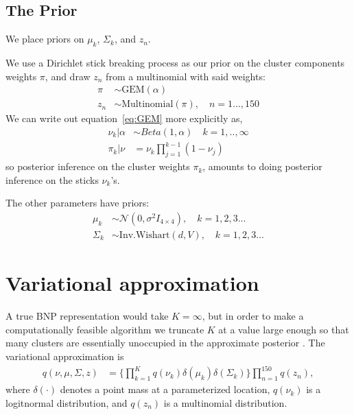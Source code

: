 \documentclass{article}
\begin{document}
\subsection{The Prior}
We place priors on $\mu_k$, $\Sigma_k$, and $z_n$.

We use a Dirichlet stick breaking process \citep{ferguson:1973:bayesian,
sethuraman:1994:constructivedp} as our prior on the cluster components weights
$\pi$, and draw $z_n$ from a multinomial with said weights:
%
\begin{align}
	\pi &\sim \text{GEM}(\alpha) \label{eq:GEM} \\
	 z_n &\sim \text{Multinomial}(\pi), \quad n = 1..., 150
\end{align}
%
We can write out equation~\ref{eq:GEM} more explicitly as,
%
\begin{align}
  \nu_k | \alpha &\sim Beta(1, \alpha) \quad k = 1, .., \infty \label{eq:beta_sticks}\\
  \pi_k | \nu &= \nu_k \prod_{j=1}^{k-1} (1 - \nu_j) \label{eq:stick_breaking}
\end{align}
%
so posterior inference on the cluster weights $\pi_k$, amounts to doing
posterior inference on the sticks $\nu_k$'s.

The other parameters have priors:
\begin{align}
	\mu_k &\sim \mathcal{N}(0, \sigma^2 I_{4\times 4}), \quad k = 1, 2, 3 ... \\
	\Sigma_k &\sim \text{Inv.Wishart}(d, V), \quad k = 1, 2, 3 ...
\end{align}


\section{Variational approximation}
%
A true BNP representation would take $K = \infty$, but in order to make a
computationally feasible algorithm we truncate $K$ at a value large enough so
that many clusters are essentially unoccupied in the approximate posterior
\citep{blei:2006:dirichletbnp}. The variational approximation is
%
\begin{align}
q(\nu, \mu, \Sigma, z) & =
\Big\{\prod_{k=1}^{K}q\left(\nu_{k}\right)\delta\left(\mu_{k}\right)
    \delta\left(\Sigma_{k}\right)\Big\} \prod_{n=1}^{150}q\left(z_{n}\right),
\end{align}
%
where $\delta\left(\cdot\right)$ denotes a point mass at a parameterized
location, $q\left(\nu_{k}\right)$ is a logitnormal distribution, and
$q\left(z_{n}\right)$ is a multinomial distribution.
\end{document}
